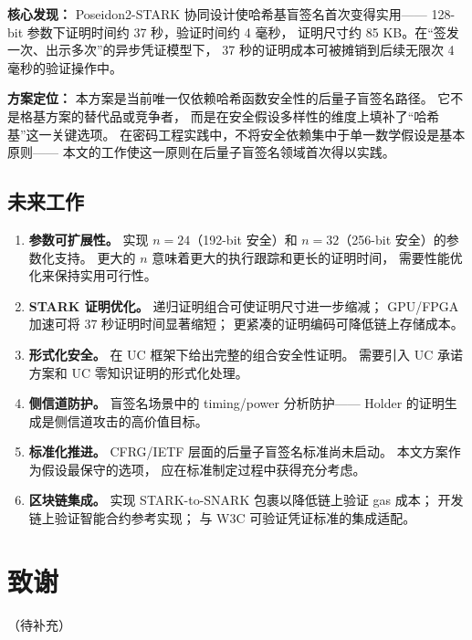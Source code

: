 \documentclass[11pt,a4paper]{ctexart}
\begin{document}
\textbf{核心发现：}
Poseidon2-STARK 协同设计使哈希基盲签名首次变得实用——
128-bit 参数下证明时间约 37 秒，验证时间约 4 毫秒，
证明尺寸约 85 KB。在``签发一次、出示多次''的异步凭证模型下，
37 秒的证明成本可被摊销到后续无限次 4 毫秒的验证操作中。

\textbf{方案定位：}
本方案是当前唯一仅依赖哈希函数安全性的后量子盲签名路径。
它不是格基方案的替代品或竞争者，
而是在安全假设多样性的维度上填补了``哈希基''这一关键选项。
在密码工程实践中，不将安全依赖集中于单一数学假设是基本原则——
本文的工作使这一原则在后量子盲签名领域首次得以实践。

\subsection{未来工作}

\begin{enumerate}[leftmargin=*]
\item \textbf{参数可扩展性。}
实现 $n=24$（192-bit 安全）和 $n=32$（256-bit 安全）的参数化支持。
更大的 $n$ 意味着更大的执行跟踪和更长的证明时间，
需要性能优化来保持实用可行性。
\item \textbf{STARK 证明优化。}
递归证明组合可使证明尺寸进一步缩减；
GPU/FPGA 加速可将 37 秒证明时间显著缩短；
更紧凑的证明编码可降低链上存储成本。
\item \textbf{形式化安全。}
在 UC 框架下给出完整的组合安全性证明。
需要引入 UC 承诺方案和 UC 零知识证明的形式化处理。
\item \textbf{侧信道防护。}
盲签名场景中的 timing/power 分析防护——
Holder 的证明生成是侧信道攻击的高价值目标。
\item \textbf{标准化推进。}
CFRG/IETF 层面的后量子盲签名标准尚未启动。
本文方案作为假设最保守的选项，
应在标准制定过程中获得充分考虑。
\item \textbf{区块链集成。}
实现 STARK-to-SNARK 包裹以降低链上验证 gas 成本；
开发链上验证智能合约参考实现；
与 W3C 可验证凭证标准的集成适配。
\end{enumerate}

\section*{致谢}

（待补充）

\printbibliography[title={参考文献}]
\end{document}
